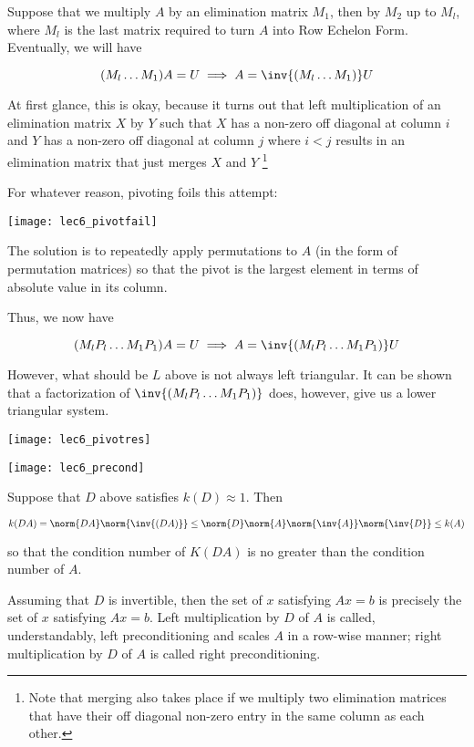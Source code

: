 \documentclass[../main.tex]{subfiles}
\begin{document}
\begin{remark}
    Suppose that we multiply $A$ by an elimination matrix $M_1$, then by $M_2$ up to $M_l$,
    where $M_l$ is the last matrix required to turn $A$ into Row Echelon Form.
    Eventually, we will have 

    \[
        (M_l \dots M_1)A = U \implies A =  \inv{(M_l \dots M_1)}U
    \]

    At first glance, this is okay, because it turns out that left multiplication of an elimination matrix $X$ by $Y$ such that $X$ has a non-zero off diagonal at column $i$ and $Y$ has a non-zero off diagonal at column $j$ where $i < j$ results in an elimination matrix that just merges $X$ and $Y$ \footnote{Note that merging also takes place if we multiply two elimination matrices that have their off diagonal non-zero entry in the same column as each other.}

    For whatever reason, pivoting foils this attempt:

    \begin{center}
        \texttt{[image: lec6\_pivotfail]}
    \end{center}

    The solution is to repeatedly apply permutations to $A$ (in the form
    of permutation matrices) so that the pivot is the largest element
    in terms of absolute value in its column.

    Thus, we now have

    \[
        (M_lP_l \dots M_1P_1)A = U \implies A = \inv{(M_lP_l \dots M_1P_1)}U
    \]

    However, what should be $L$ above is not always left triangular. It can be shown that a factorization of $\inv{(M_lP_l \dots M_1P_1)}$ does, however, give us a lower triangular system.
\begin{center}
    \texttt{[image: lec6\_pivotres]}
\end{center}
\end{remark}

\begin{center}
    \texttt{[image: lec6\_precond]}
\end{center}
\begin{remark}
    Suppose that $D$ above satisfies $k(D) \approx 1$. Then

    \[
        k(DA) = \norm{DA}\norm{\inv{(DA)}} \leq \norm{D}\norm{A}\norm{\inv{A}}\norm{\inv{D}} \leq k(A)
    \]

    so that the condition number of $K(DA)$ is no greater than the condition number of $A$.

    Assuming that $D$ is invertible, then the set of $x$ satisfying
    $Ax = b$ is precisely the set of $x$ satisfying $Ax = b$. Left multiplication
    by $D$ of $A$ is called, understandably, left preconditioning and scales
    $A$ in a row-wise manner; right multiplication by $D$ of $A$ is called right
    preconditioning.
\end{remark}
\end{document}
